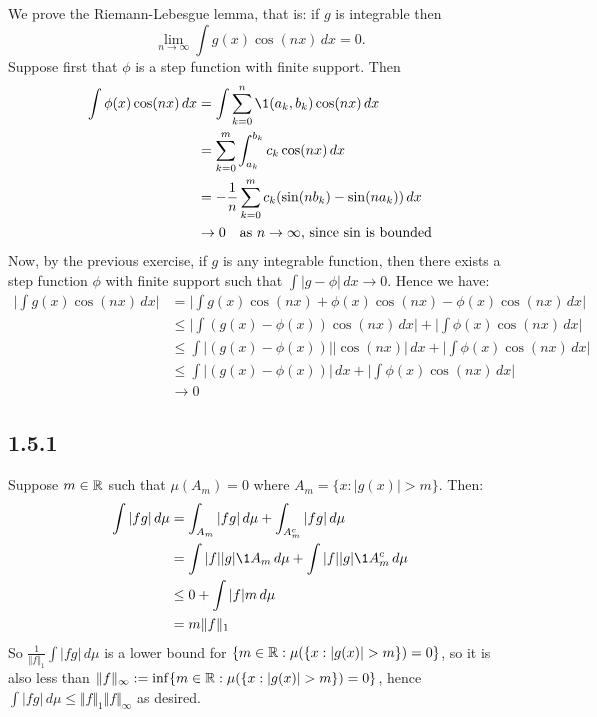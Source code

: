 \documentclass[11pt]{article}
\begin{document}
We prove the Riemann-Lebesgue lemma, that is: if $g$ is integrable then \[\lim_{n\to\infty} \int g(x) \cos(nx) \,dx = 0.\] Suppose first that $\phi$ is a step function with finite support. Then \begin{align*}
    \int \phi(x) \cos(nx) \,dx &  =\int \sum_{k=0}^{n} \1{(a_k,b_k)} \cos(nx)  \,dx\\
    &= \sum_{k=0}^{m} \int_{a_k}^{b_k} c_k\cos(nx) \,dx \\
    &= -\frac{1}{n}\sum_{k=0}^{m} c_k(\sin(nb_k)- \sin(na_k))\,dx \\
    &\to 0 \quad \text{as $n \to \infty$, since $\sin$ is bounded}
\end{align*} Now, by the previous exercise, if $g$ is any integrable function, then there exists a step function $\phi$ with finite support such that $\int |g - \phi| \,dx \to 0$. Hence we have: \begin{align*}
    \bigg|\int g(x) \cos(nx) \,dx \bigg| &=\bigg|\int g(x) \cos(nx)+ \phi(x)\cos(nx) - \phi(x)\cos(nx) \,dx \bigg| \\
    &\leq \bigg|\int (g(x) -\phi(x))\cos(nx) \,dx \bigg| + \bigg|\int \phi(x)\cos(nx) \,dx \bigg|\\
    &\leq \int \big|(g(x) -\phi(x))\big|\big|\cos(nx)\big| \,dx  + \bigg|\int \phi(x)\cos(nx) \,dx \bigg|\\
    &\leq  \int\big|(g(x) -\phi(x))\big| \,dx  + \bigg|\int \phi(x)\cos(nx) \,dx \bigg| \\
    &\to 0
\end{align*} 

\subsection*{1.5.1}

Suppose $m \in {\mathbb R}$ such that $\mu(A_m)=0$ where $A_m = \{x : |g(x)| > m\}$. Then:
\begin{align*}
    \int |fg| \,d\mu  &=    \int_{A_m} |fg| \,d\mu +  \int_{A_m^c} |fg| \,d\mu\\
    &=\int |f||g| \1{A_m} \,d\mu + \int |f||g| \1{A_m^c} \,d\mu \\
    &\leq 0 + \int |f|m \,d\mu \\
    &= m \Vert f \Vert_1
\end{align*} So $\frac{1}{\Vert f \Vert_1}\int |fg| \,d\mu$ is a lower bound for $\{m \in {\mathbb R} : \mu(\{x : |g(x)| > m\}) = 0\}$, so it is also less than $\Vert f\Vert_{\infty} := \inf \{m \in {\mathbb R} : \mu(\{x : |g(x)| > m\}) = 0\}$, hence $\int |fg| \,d\mu \leq \Vert f \Vert_1\Vert f\Vert_{\infty}$ as desired.
\end{document}
